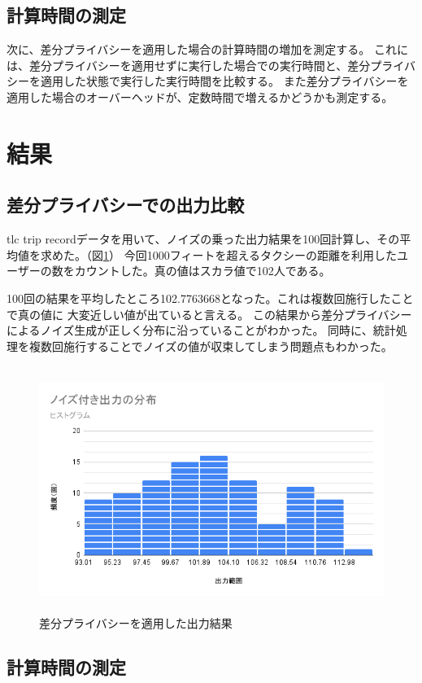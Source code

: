 \documentclass[a4paper,11pt]{jreport}
\begin{document}
\subsection{計算時間の測定}

次に、差分プライバシーを適用した場合の計算時間の増加を測定する。
これには、差分プライバシーを適用せずに実行した場合での実行時間と、差分プライバシーを適用した状態で実行した実行時間を比較する。
また差分プライバシーを適用した場合のオーバーヘッドが、定数時間で増えるかどうかも測定する。

\section{結果}
\subsection{差分プライバシーでの出力比較}

tlc trip recordデータを用いて、ノイズの乗った出力結果を100回計算し、その平均値を求めた。（図\ref{fig:noise}）
今回1000フィートを超えるタクシーの距離を利用したユーザーの数をカウントした。真の値はスカラ値で102人である。

100回の結果を平均したところ102.7763668となった。これは複数回施行したことで真の値に
大変近しい値が出ていると言える。
この結果から差分プライバシーによるノイズ生成が正しく分布に沿っていることがわかった。
同時に、統計処理を複数回施行することでノイズの値が収束してしまう問題点もわかった。

\begin{figure}[htbp]
    \centering
\includegraphics[height=80mm]{noise.png}
    \caption{差分プライバシーを適用した出力結果}
    \label{fig:noise}
\end{figure}

\subsection{計算時間の測定}
\end{document}
